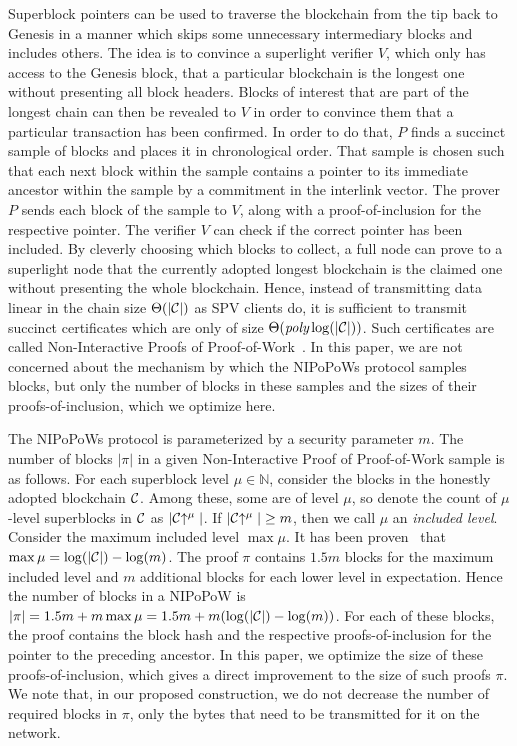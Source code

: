Superblock pointers can be used to traverse the blockchain from the tip back to
Genesis in a manner which skips some unnecessary intermediary blocks and
includes others. The idea is to convince a superlight verifier $V$, which only
has access to the Genesis block, that a particular blockchain is the longest one
without presenting all block headers. Blocks of interest that are part of the
longest chain can then be revealed to $V$ in order to convince them that a
particular transaction has been confirmed. In order to do that, $P$ finds a
succinct sample of blocks and places it in chronological order. That sample is
chosen such that each next block within the sample contains a pointer to its
immediate ancestor within the sample by a commitment in the interlink vector.
The prover $P$ sends each block of the sample to $V$, along with a
proof-of-inclusion for the respective pointer. The verifier $V$ can check if the
correct pointer has been included. By cleverly choosing which blocks to collect,
a full node can prove to a superlight node that the currently adopted longest
blockchain is the claimed one without presenting the whole blockchain. Hence,
instead of transmitting data linear in the chain size $\Theta(|\mathcal{C}|)$ as SPV
clients do, it is sufficient to transmit succinct certificates which are only of
size $\Theta(\emph{poly}\log(|\mathcal{C}|))$. Such certificates are called
Non-Interactive Proofs of Proof-of-Work~\cite{nipopows}. In this paper, we are
not concerned about the mechanism by which the NIPoPoWs protocol samples blocks,
but only the number of blocks in these samples and the sizes of their
proofs-of-inclusion, which we optimize here.

The NIPoPoWs protocol is parameterized by a security parameter $m$. The number
of blocks $|\pi|$ in a given Non-Interactive Proof of Proof-of-Work sample is as
follows. For each superblock level $\mu \in \mathbb{N}$, consider the
blocks in the honestly adopted blockchain $\mathcal{C}$. Among these, some
are of level $\mu$, so denote the count of $\mu$-level superblocks in $\mathcal{C}$
as $|\mathcal{C}\negthickspace\uparrow^\mu|$. If $|\mathcal{C}\negthickspace\uparrow^\mu| \geq m$, then we call $\mu$
an \emph{included level}. Consider the maximum included level $\max\mu$. It has
been proven~\cite{nipopows} that $\max\mu = \log(|\mathcal{C}|) - \log(m)$. The proof
$\pi$ contains $1.5m$ blocks for the maximum included level and $m$ additional blocks for
each lower level in expectation. Hence the number of blocks in a NIPoPoW is
$|\pi| = 1.5m + m \max\mu = 1.5m + m(\log(|\mathcal{C}|) - \log(m))$. For each of
these blocks, the proof contains the block hash and the respective
proofs-of-inclusion for the pointer to the preceding ancestor. In this paper, we
optimize the size of these proofs-of-inclusion, which gives a direct improvement
to the size of such proofs $\pi$. We note that, in our proposed construction,
we do not decrease the number of required blocks in $\pi$, only the bytes that
need to be transmitted for it on the network.

